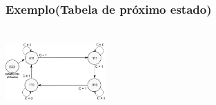\documentclass{beamer}
\begin{document}
\begin{frame}
  \frametitle{Exemplo(Tabela de próximo estado)} 
  \begin{columns}[c]
   
   \begin{column}{3cm}
      \begin{center}
	\includegraphics[height = 1in, width = 1.5in]
    {images/exemplo_projeto_10.png}
      \end{center}
   \end{column}


\end{columns}
\end{frame}
\end{document}
